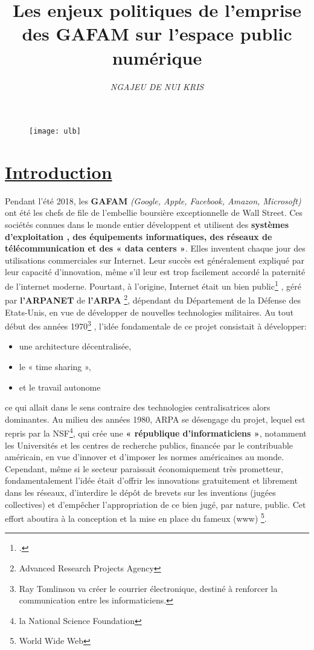 \documentclass[12pt,a4paper]{article} %
\title {\textbf {Les enjeux politiques de l’emprise des GAFAM sur l’espace public numérique }} %
\author{\textit{NGAJEU DE NUI KRIS}} %
\date{} %
\begin{document}
	
	\maketitle %
	
	
	\begin{figure}[h]
		\centering
		\texttt{[image: ulb]}
	\end{figure}
	
	
	\tableofcontents %
	
	\section{\underline{Introduction}}
	Pendant l’été 2018, les \textbf{GAFAM} \textit{(Google, Apple, Facebook, Amazon, Microsoft)} ont été les chefs de file de l’embellie boursière exceptionnelle de Wall Street. Ces sociétés connues dans le monde entier développent et utilisent des \textbf{systèmes d’exploitation , des équipements informatiques, des réseaux de télécommunication et des « data centers »}. Elles inventent chaque jour des utilisations commerciales sur Internet. Leur succès est généralement expliqué par leur capacité d’innovation, même s’il leur est trop facilement accordé la paternité de l’internet moderne.
	Pourtant, à l’origine, Internet était un bien public\footcite{Smyrnaios2017} , géré par \textbf{l’ARPANET} de \textbf{l’ARPA} \footnote[2]{Advanced Research Projects Agency}, dépendant du Département de la Défense des Etats-Unis, en vue de développer de nouvelles technologies militaires. Au tout début des années 1970\footnote[3]{Ray Tomlinson va créer le courrier électronique, destiné à renforcer la communication entre les informaticiens.} , l’idée fondamentale de ce projet consistait à développer:\begin{itemize}
		\item  une architecture décentralisée,
		\item le « time sharing »,
		\item et le travail autonome
	\end{itemize}    ce qui allait dans le sens contraire des technologies centralisatrices alors dominantes.
	Au milieu des années 1980, ARPA se désengage du projet, lequel est repris par la NSF\footnote[4]{la National Science Foundation}, qui crée une \textbf{ « république d’informaticiens »}, notamment les Universités et les centres de recherche publics, financée par le contribuable américain, en vue d’innover et d’imposer les normes américaines au monde. Cependant, même si le secteur paraissait économiquement très prometteur, fondamentalement l’idée était d’offrir les innovations gratuitement et librement dans les réseaux, d’interdire le dépôt de brevets sur les inventions (jugées collectives) et d’empêcher l’appropriation de ce bien jugé, par nature, public. Cet effort aboutira à la conception et la mise en place du fameux (www) \footnote[5]{World Wide Web}. 
\end{document}

